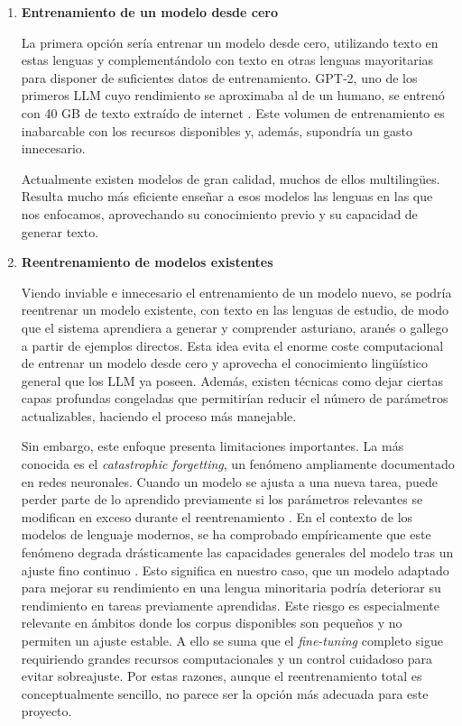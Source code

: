 \begin{enumerate}
\item \textbf{Entrenamiento de un modelo desde cero} 

La primera opción sería entrenar un modelo desde cero, utilizando texto en estas lenguas y complementándolo con texto en otras lenguas mayoritarias para disponer de suficientes datos de entrenamiento. GPT‑2, uno de los primeros LLM cuyo rendimiento se aproximaba al de un humano, se entrenó con 40 GB de texto extraído de internet \cite{radford2019language}. Este volumen de entrenamiento es inabarcable con los recursos disponibles y, además, supondría un gasto innecesario.

Actualmente existen modelos de gran calidad, muchos de ellos multilingües. Resulta mucho más eficiente enseñar a esos modelos las lenguas en las que nos enfocamos, aprovechando su conocimiento previo y su capacidad de generar texto.

\item \textbf{Reentrenamiento de modelos existentes}

Viendo inviable e innecesario el entrenamiento de un modelo nuevo, se podría reentrenar un modelo existente, con texto en las lenguas de estudio, de modo que el sistema aprendiera a generar y comprender asturiano, aranés o gallego a partir de ejemplos directos. Esta idea evita el enorme coste computacional de entrenar un modelo desde cero y aprovecha el conocimiento lingüístico general que los LLM ya poseen. Además, existen técnicas como dejar ciertas capas profundas congeladas que permitirían reducir el número de parámetros actualizables, haciendo el proceso más manejable.

Sin embargo, este enfoque presenta limitaciones importantes. La más conocida es el \textit{catastrophic forgetting}, un fenómeno ampliamente documentado en redes neuronales. Cuando un modelo se ajusta a una nueva tarea, puede perder parte de lo aprendido previamente si los parámetros relevantes se modifican en exceso durante el reentrenamiento \cite{Kirkpatrick_2017}. En el contexto de los modelos de lenguaje modernos, se ha comprobado empíricamente que este fenómeno degrada drásticamente las capacidades generales del modelo tras un ajuste fino continuo \cite{luo2023an}. Esto significa en nuestro caso, que un modelo adaptado para mejorar su rendimiento en una lengua minoritaria podría deteriorar su rendimiento en tareas previamente aprendidas. Este riesgo es especialmente relevante en ámbitos donde los corpus disponibles son pequeños y no permiten un ajuste estable. A ello se suma que el \textit{fine-tuning} completo sigue requiriendo grandes recursos computacionales y un control cuidadoso para evitar sobreajuste. Por estas razones, aunque el reentrenamiento total es conceptualmente sencillo, no parece ser la opción más adecuada para este proyecto.


\end{enumerate}
